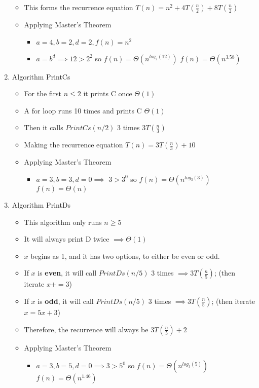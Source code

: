 \documentclass[11pt]{article}
\newcounter{prnum}
\newenvironment{problem}{{\vskip 0.2in\noindent\bf Problem
       \addtocounter{prnum}{1} \arabic{prnum}.}}{\vskip 0.1in}
\begin{document}
\begin{problem}
\begin{enumerate}[label=\alph*)]
\begin{itemize}
      \item This forms the recurrence equation $T(n) = n^2 + 4T(\frac{n}{2}) + 8T(\frac{n}{2})$
      \item Applying Master's Theorem
        \begin{itemize}
          \item $a = 4, b = 2, d = 2, f(n) = n^2$
          \item $a = b^d \implies 12 > 2^2$ so $f(n) = \Theta(n^{log_2(12)})$ \Rightarrow $f(n) = \Theta(n^{3.58})$
        \end{itemize}
    \end{itemize}
  \item Algorithm PrintCs
    \begin{itemize}
      \item For the first $n \leq 2$ it prints C once \Rightarrow $\Theta(1)$
      \item A for loop runs 10 times and prints C \Rightarrow $\Theta(1)$
      \item Then it calls $PrintCs(n/2)$ 3 times \Rightarrow $3T(\frac{n}{3})$
      \item Making the recurrence equation $T(n) = 3T(\frac{n}{3}) + 10$
      \item Applying Master's Theorem
        \begin{itemize}
          \item $a = 3, b = 3, d = 0 \implies$ $3 > 3^0$ so $f(n) = \Theta(n^{log_3(3)})$ \Rightarrow $f(n) = \Theta(n)$
        \end{itemize}
    \end{itemize}
    \pagebreak

  \item Algorithm PrintDs
    \begin{itemize}
      \item This algorithm only runs $n \geq 5$
      \item It will always print D twice $\implies \Theta(1)$
      \item $x$ begins as 1, and it has two options, to either be even or odd.
      \item If $x$ is \textbf{even}, it will call $PrintDs(n/5)$ 3 times $\implies 3T(\frac{n}{5})$; (then iterate $x += 3$)
      \item If $x$ is \textbf{odd}, it will call $PrintDs(n/5)$ 3 times $\implies 3T(\frac{n}{5})$; (then iterate $x = 5x + 3$)
      \item Therefore, the recurrence will always be $3T(\frac{n}{5}) + 2$
      \item Applying Master's Theorem
        \begin{itemize}
          \item $a = 3, b = 5, d = 0 \implies 3 > 5^0$ so $f(n) = \Theta(n^{log_3(5)})$ \Rightarrow $f(n) = \Theta(n^{1.46})$
        \end{itemize}
    \end{itemize}
\end{enumerate}
\end{problem}
\end{document}

